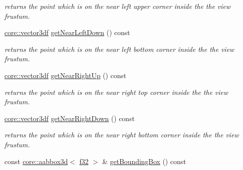\begin{DoxyCompactItemize}
\begin{DoxyCompactList}\small\item\em returns the point which is on the near left upper corner inside the the view frustum. \end{DoxyCompactList}\item 
\hyperlink{namespaceirr_1_1core_a06f169d08b5c429f5575acb7edbad811}{core\+::vector3df} \hyperlink{structirr_1_1scene_1_1SViewFrustum_addbe9237ea17c93ae60bc4c27e862a76}{get\+Near\+Left\+Down} () const \hypertarget{structirr_1_1scene_1_1SViewFrustum_addbe9237ea17c93ae60bc4c27e862a76}{}\label{structirr_1_1scene_1_1SViewFrustum_addbe9237ea17c93ae60bc4c27e862a76}

\begin{DoxyCompactList}\small\item\em returns the point which is on the near left bottom corner inside the the view frustum. \end{DoxyCompactList}\item 
\hyperlink{namespaceirr_1_1core_a06f169d08b5c429f5575acb7edbad811}{core\+::vector3df} \hyperlink{structirr_1_1scene_1_1SViewFrustum_a4fe9e7b51a3f7f7235ef0f895bf32054}{get\+Near\+Right\+Up} () const \hypertarget{structirr_1_1scene_1_1SViewFrustum_a4fe9e7b51a3f7f7235ef0f895bf32054}{}\label{structirr_1_1scene_1_1SViewFrustum_a4fe9e7b51a3f7f7235ef0f895bf32054}

\begin{DoxyCompactList}\small\item\em returns the point which is on the near right top corner inside the the view frustum. \end{DoxyCompactList}\item 
\hyperlink{namespaceirr_1_1core_a06f169d08b5c429f5575acb7edbad811}{core\+::vector3df} \hyperlink{structirr_1_1scene_1_1SViewFrustum_a74e011d85fb41206b5dd0af76635dc00}{get\+Near\+Right\+Down} () const \hypertarget{structirr_1_1scene_1_1SViewFrustum_a74e011d85fb41206b5dd0af76635dc00}{}\label{structirr_1_1scene_1_1SViewFrustum_a74e011d85fb41206b5dd0af76635dc00}

\begin{DoxyCompactList}\small\item\em returns the point which is on the near right bottom corner inside the the view frustum. \end{DoxyCompactList}\item 
const \hyperlink{classirr_1_1core_1_1aabbox3d}{core\+::aabbox3d}$<$ \hyperlink{namespaceirr_a0277be98d67dc26ff93b1a6a1d086b07}{f32} $>$ \& \hyperlink{structirr_1_1scene_1_1SViewFrustum_a4328fe06bedd409ae20e9efc64e68706}{get\+Bounding\+Box} () const \hypertarget{structirr_1_1scene_1_1SViewFrustum_a4328fe06bedd409ae20e9efc64e68706}{}\label{structirr_1_1scene_1_1SViewFrustum_a4328fe06bedd409ae20e9efc64e68706}


\end{DoxyCompactItemize}
